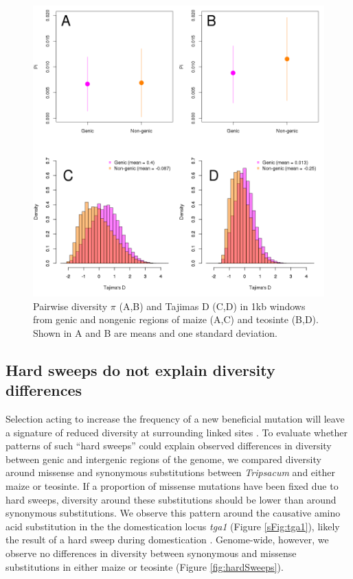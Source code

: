 \documentclass{pnastwo}
\begin{document}
\begin{article}
\begin{figure}
\begin{center}
  \includegraphics[width=.4\textwidth] {FigsAndFiles/Pi_and_Tajima.png}
\end{center}
\caption{Pairwise diversity $\pi$ (A,B) and Tajimas D (C,D) in 1kb windows from genic and nongenic regions of maize (A,C) and teosinte (B,D). Shown in A and B are means and one standard deviation.   \label{fig:diversity} }
\end{figure}

\subsection{Hard sweeps do not explain diversity differences}
Selection acting to increase the frequency of a new beneficial mutation will leave a signature of reduced diversity at surrounding linked sites \cite{smith1974}.
To evaluate whether patterns of such ``hard sweeps'' could explain observed differences in diversity between genic and intergenic regions of the genome, we compared diversity around missense and synonymous substitutions between \emph{Tripsacum} and either maize or teosinte.
If a proportion of missense mutations have been fixed due to hard sweeps, diversity around these substitutions should be lower than around synonymous substitutions. 
We observe this pattern around the causative amino acid substitution in the the domestication locus \emph{tga1} (Figure \ref{sFig:tga1}), likely the result of a hard sweep during domestication \cite{wang2005origin, wang2015}.
Genome-wide, however, we observe no differences in diversity between synonymous and missense substitutions in either maize or teosinte (Figure
\ref{fig:hardSweeps}).


\end{article}
\end{document}
